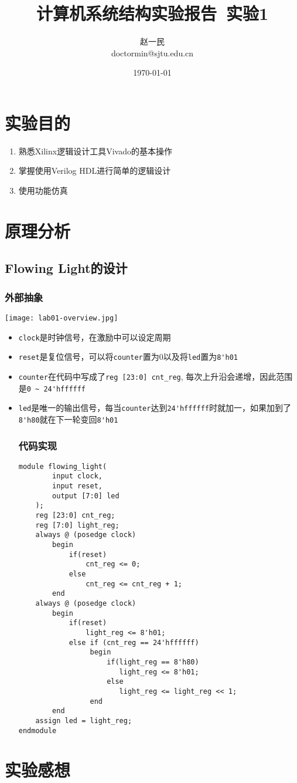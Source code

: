 \documentclass[12pt,a4paper]{article}
\title{\textbf{计算机系统结构实验报告\ 实验1}} %
\author{赵一民\quad 518030910188\\ doctormin@sjtu.edu.cn } %
\date{\today} %
\begin{document}
\maketitle %


\section{实验目的}
\begin{enumerate}
    \item 熟悉Xilinx逻辑设计工具Vivado的基本操作
    \item 掌握使用Verilog HDL进行简单的逻辑设计
    \item 使用功能仿真
\end{enumerate}
\section{原理分析}
\subsection{Flowing Light的设计}
\subsubsection{外部抽象}
\texttt{[image: lab01-overview.jpg]}
\begin{itemize}
    \item \texttt{clock}是时钟信号，在激励中可以设定周期
    \item \texttt{reset}是复位信号，可以将\texttt{counter}置为0以及将\texttt{led}置为\lstinline{8'h01}
    \item \texttt{counter}在代码中写成了\lstinline{reg [23:0] cnt_reg}, 每次上升沿会递增，因此范围是\lstinline{0 ~ 24'hffffff}
    \item \texttt{led}是唯一的输出信号，每当\texttt{counter}达到\lstinline{24'hffffff}时就加一，如果加到了\lstinline{8'h80}就在下一轮变回\lstinline{8'h01}
\pagebreak
\subsubsection{代码实现}
\begin{lstlisting}
module flowing_light(
        input clock,
        input reset,
        output [7:0] led
    );
    reg [23:0] cnt_reg;
    reg [7:0] light_reg;
    always @ (posedge clock) 
        begin
            if(reset)
                cnt_reg <= 0;
            else
                cnt_reg <= cnt_reg + 1;
        end
    always @ (posedge clock) 
        begin
            if(reset)
                light_reg <= 8'h01;
            else if (cnt_reg == 24'hffffff) 
                 begin
                     if(light_reg == 8'h80)
                        light_reg <= 8'h01;
                     else
                        light_reg <= light_reg << 1;
                 end
        end
    assign led = light_reg;
endmodule
\end{lstlisting}
\end{itemize}

\section{实验感想}

\pagebreak
\end{document}
